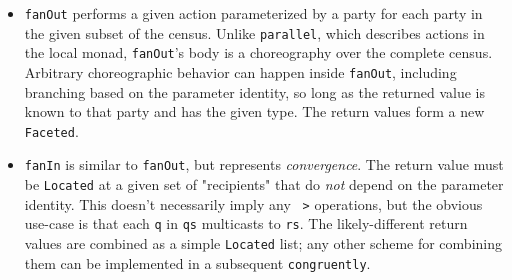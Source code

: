 \documentclass[sigplan,screen,review,anonymous]{acmart}
\newcommand{\HLS}[1][small]{$\rotatebox[origin=c]{15}{\textphnc{e}}\hspace{-1pt}_{λ\mathrm{#1}}$\xspace}
\newcommand{\inlinecode}[2][haskell]{\texttt{#2}}
\begin{document}
\begin{itemize}[leftmargin=12pt, topsep=2pt]
          this gives the behavior of \HLS's auto-enclaving "case" expressions.
    \item \inlinecode{fanOut} performs a given action parameterized by a party
          for each party in the given subset of the census.
          Unlike \inlinecode{parallel}, which describes actions in the local monad,
          \inlinecode{fanOut}'s body is a choreography over the complete census.
          Arbitrary choreographic behavior can happen inside \inlinecode{fanOut},
          including branching based on the parameter identity,
          so long as the returned value is known to that party and has the given type.
          The return values form a new \inlinecode{Faceted}.
    \item \inlinecode{fanIn} is similar to \inlinecode{fanOut}, but represents \emph{convergence}.
          The return value must be \inlinecode{Located} at a given set of "recipients"
          that do \emph{not} depend on the parameter identity.
          This doesn't necessarily imply any \inlinecode{~>} operations,
          but the obvious use-case is that each \inlinecode{q} in \inlinecode{qs}
          multicasts to \inlinecode{rs}.
          The likely-different return values are combined as a simple \inlinecode{Located} list;
          any other scheme for combining them can be implemented
          in a subsequent \inlinecode{congruently}.
\end{itemize}
\end{document}
